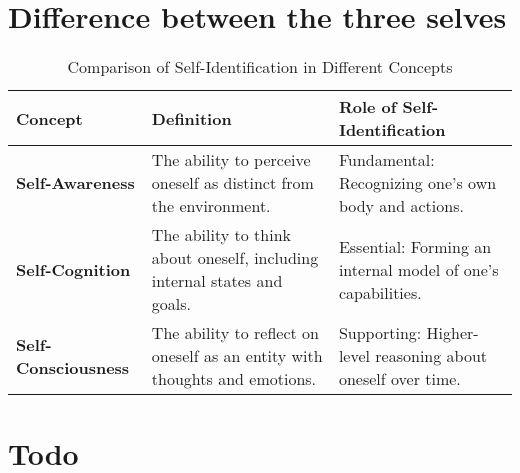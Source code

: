 \section{Difference between the three selves}
    \begin{table}[h!]
    \centering
    \begin{tabular}{|l|l|l|}
        \hline
        \textbf{Concept}          
            & \textbf{Definition}                                                      
            & \textbf{Role of Self-Identification}                                \\ \hline
        \textbf{Self-Awareness}    
            & The ability to perceive oneself as distinct from the environment.    
            & Fundamental: Recognizing one’s own body and actions.               \\ \hline
        \textbf{Self-Cognition}    
            & The ability to think about oneself, including internal states and goals.  
            & Essential: Forming an internal model of one’s capabilities.        \\ \hline
        \textbf{Self-Consciousness} 
            & The ability to reflect on oneself as an entity with thoughts and emotions. 
            & Supporting: Higher-level reasoning about oneself over time.        \\ \hline
    \end{tabular}
    \caption{Comparison of Self-Identification in Different Concepts}
\end{table}

\section{Todo}
